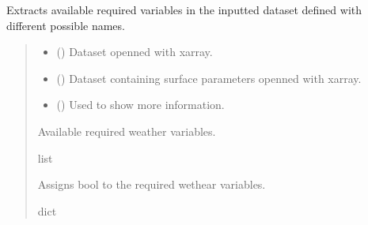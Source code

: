 \documentclass[a4paper,11pt,english]{sphinxmanual}
\begin{document}
\begin{fulllineitems}
\label{\detokenize{modules:climaccf.extract_data.extract_data_variables}}
\pysigstartsignatures
{}
\pysigstopsignatures
\sphinxAtStartPar
Extracts available required variables in the inputted dataset defined with different possible names.
\begin{quote}\begin{description}
\begin{itemize}
\item {} 
\sphinxAtStartPar
{} () \textendash{} Dataset openned with xarray.

\item {} 
\sphinxAtStartPar
{} () \textendash{} Dataset containing surface parameters openned with xarray.

\item {} 
\sphinxAtStartPar
{} () \textendash{} Used to show more information.

\end{itemize}

\sphinxAtStartPar
Available required weather variables.

\sphinxAtStartPar
list

\sphinxAtStartPar
Assigns bool to the required wethear variables.

\sphinxAtStartPar
dict

\end{description}\end{quote}

\end{fulllineitems}

\end{document}
